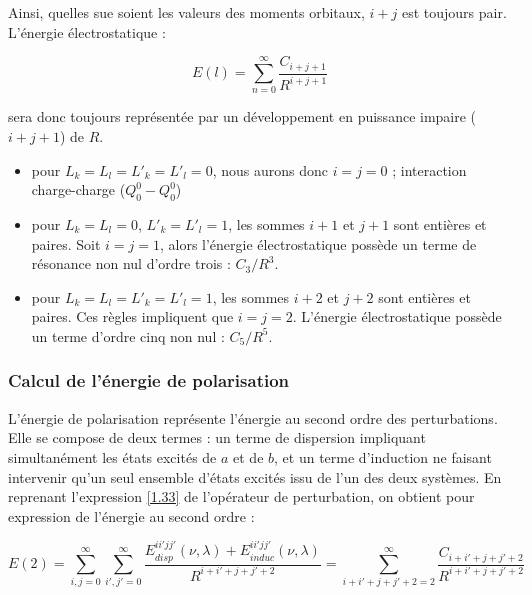 	Ainsi, quelles sue soient les valeurs des moments orbitaux, $i + j$ est toujours pair. L'énergie électrostatique : 
	
	\begin{equation}
	E(l) = \sum_{n=0}^{\infty} \frac{C_{i+j+1}}{R^{i+j+1}}
	\end{equation}
	
	sera donc toujours représentée par un développement en puissance impaire ($i+ j + 1$) de $R$.
	
	\begin{itemize}
		\item pour $L_{k}=L_{l}=L'_{k}=L'_{l} = 0$, nous aurons donc $i=j=0$ ; interaction charge-charge ($Q_{0}^{0}- Q_{0}^{0}$)	
		\item pour $L_{k}=L_{l}=0$, $L'_{k}=L'_{l}=1$, les sommes $i+1$ et $j+1$ sont entières et paires. Soit $i=j=1$, alors l'énergie électrostatique possède un terme de résonance non nul d'ordre trois : $C_{3}/R^{3}$.
		\item pour $L_{k}=L_{l}=L'_{k}=L'_{l}=1$, les sommes $i+2$ et $j+2$ sont entières et paires. Ces règles impliquent que $i=j=2$. L'énergie électrostatique possède un terme d'ordre cinq non nul : $C_{5}/R^{5}$.
	\end{itemize}
	
	
	\subsubsection{Calcul de l’énergie de polarisation}
	
	L'énergie de polarisation représente l'énergie au second ordre des perturbations. Elle se compose de deux termes : un terme de dispersion impliquant simultanément les états excités de $a$ et de $b$, et un terme d'induction ne faisant intervenir qu'un seul ensemble d'états excités issu de l'un des deux systèmes. En reprenant l'expression \ref{1.33} de l'opérateur de perturbation, on obtient pour expression de l'énergie au second ordre : 
	
	\begin{equation}
	E(2) = \sum_{i,j=0}^{\infty} \sum_{i',j'=0}^{\infty} \frac{E_{disp}^{ii'jj'} (\nu , \lambda) + E_{induc}^{ii'jj'}(\nu , \lambda)}{R^{i+i'+j+j'+2}} = \sum_{i+i'+j+j'+2=2}^{\infty} \frac{C_{i+i'+j+j'+2}}{R^{i+i'+j+j'+2}} \label{2.21}
	\end{equation}
	
